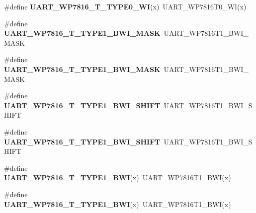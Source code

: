 \begin{DoxyCompactItemize}
\item 
\#define {\bfseries U\+A\+R\+T\+\_\+\+W\+P7816\+\_\+\+T\+\_\+\+T\+Y\+P\+E0\+\_\+\+WI}(x)~U\+A\+R\+T\+\_\+\+W\+P7816\+T0\+\_\+\+WI(x)\hypertarget{group__Backward__Compatibility__Symbols_ga1d1dbaccc030f4bb7c78161c422cfd6c}{}\label{group__Backward__Compatibility__Symbols_ga1d1dbaccc030f4bb7c78161c422cfd6c}

\item 
\#define {\bfseries U\+A\+R\+T\+\_\+\+W\+P7816\+\_\+\+T\+\_\+\+T\+Y\+P\+E1\+\_\+\+B\+W\+I\+\_\+\+M\+A\+SK}~U\+A\+R\+T\+\_\+\+W\+P7816\+T1\+\_\+\+B\+W\+I\+\_\+\+M\+A\+SK\hypertarget{group__Backward__Compatibility__Symbols_gadb34493e13585c4acf5c3fba81e0e03f}{}\label{group__Backward__Compatibility__Symbols_gadb34493e13585c4acf5c3fba81e0e03f}

\item 
\#define {\bfseries U\+A\+R\+T\+\_\+\+W\+P7816\+\_\+\+T\+\_\+\+T\+Y\+P\+E1\+\_\+\+B\+W\+I\+\_\+\+M\+A\+SK}~U\+A\+R\+T\+\_\+\+W\+P7816\+T1\+\_\+\+B\+W\+I\+\_\+\+M\+A\+SK\hypertarget{group__Backward__Compatibility__Symbols_gadb34493e13585c4acf5c3fba81e0e03f}{}\label{group__Backward__Compatibility__Symbols_gadb34493e13585c4acf5c3fba81e0e03f}

\item 
\#define {\bfseries U\+A\+R\+T\+\_\+\+W\+P7816\+\_\+\+T\+\_\+\+T\+Y\+P\+E1\+\_\+\+B\+W\+I\+\_\+\+S\+H\+I\+FT}~U\+A\+R\+T\+\_\+\+W\+P7816\+T1\+\_\+\+B\+W\+I\+\_\+\+S\+H\+I\+FT\hypertarget{group__Backward__Compatibility__Symbols_ga23a788a5415cebd78a364d0578ee9b7c}{}\label{group__Backward__Compatibility__Symbols_ga23a788a5415cebd78a364d0578ee9b7c}

\item 
\#define {\bfseries U\+A\+R\+T\+\_\+\+W\+P7816\+\_\+\+T\+\_\+\+T\+Y\+P\+E1\+\_\+\+B\+W\+I\+\_\+\+S\+H\+I\+FT}~U\+A\+R\+T\+\_\+\+W\+P7816\+T1\+\_\+\+B\+W\+I\+\_\+\+S\+H\+I\+FT\hypertarget{group__Backward__Compatibility__Symbols_ga23a788a5415cebd78a364d0578ee9b7c}{}\label{group__Backward__Compatibility__Symbols_ga23a788a5415cebd78a364d0578ee9b7c}

\item 
\#define {\bfseries U\+A\+R\+T\+\_\+\+W\+P7816\+\_\+\+T\+\_\+\+T\+Y\+P\+E1\+\_\+\+B\+WI}(x)~U\+A\+R\+T\+\_\+\+W\+P7816\+T1\+\_\+\+B\+WI(x)\hypertarget{group__Backward__Compatibility__Symbols_ga494a1fd499433faa3dc6301dc82f2106}{}\label{group__Backward__Compatibility__Symbols_ga494a1fd499433faa3dc6301dc82f2106}

\item 
\#define {\bfseries U\+A\+R\+T\+\_\+\+W\+P7816\+\_\+\+T\+\_\+\+T\+Y\+P\+E1\+\_\+\+B\+WI}(x)~U\+A\+R\+T\+\_\+\+W\+P7816\+T1\+\_\+\+B\+WI(x)\hypertarget{group__Backward__Compatibility__Symbols_ga494a1fd499433faa3dc6301dc82f2106}{}\label{group__Backward__Compatibility__Symbols_ga494a1fd499433faa3dc6301dc82f2106}


\end{DoxyCompactItemize}
